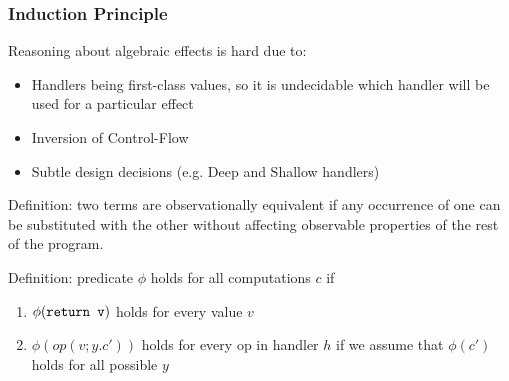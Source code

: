 \documentclass[t]{beamer}
\begin{document}
\begin{frame}[fragile]
\frametitle{Induction Principle}
	Reasoning about algebraic effects is hard due to:
	\begin{itemize}
		\item Handlers being first-class values, so it is undecidable which handler will be used for a particular effect
		\item Inversion of Control-Flow
		\item Subtle design decisions (e.g. Deep and Shallow handlers) 
	\end{itemize}

	Definition: two terms are \alert{observationally} equivalent if any occurrence of one can be substituted with the other without affecting observable properties of the rest of the program.

	Definition: predicate $\phi$ holds for all computations $c$ if
	\begin{enumerate}
		\item $\phi(\verb|return v|)$ holds for every value $v$
		\item $\phi(op(v; y.c'))$ holds for every op in handler $h$ if we assume that $\phi(c')$ holds for all \alert{possible} $y$ 
	\end{enumerate}
	
\end{frame}
\end{document}
